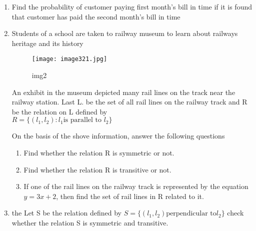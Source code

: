 \documentclass{article}
\begin{document}
\begin{enumerate}
\item Find the probability of customer paying first month's bill in time if it is found that customer has paid the second month's bill in time

\item Students of a school are taken to railway museum to learn about railways heritage and its history

\begin{figure}[h!] 
\centering  
\texttt{[image: image321.jpg]} 
\caption{img2}
\label{fig:image321}                      
\end{figure}

An exhibit in the museum depicted many rail lines on the track near the railway station. Last L. be the set of all rail lines on the railway track and R be the relation on L defined by\\
$R = \{(l_1, l_2):l_1 \text{is parallel to }l_2\}$

On the basis of the shove information, answer the following questions
\begin{enumerate}
\item Find whether the relation R is symmetric or not.
\item Find whether the relation R is transitive or not.
\item If one of the rail lines on the railway track is represented by the equation $y=3x+ 2$, then find the set of rail lines in R related to it.
\end{enumerate}
\item the Let S be the relation defined by $ S = \{(l_1,l_2)\text{perpendicular to} l_2\}$ check whether the relation S is symmetric and transitive.
\end{enumerate}
\end{document}
